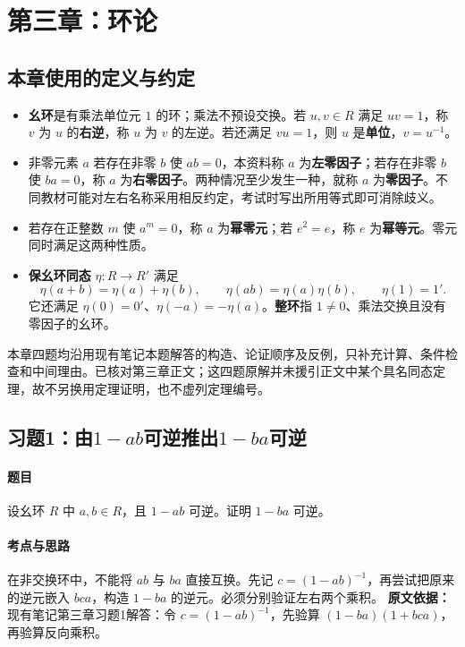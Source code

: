 \section{第三章：环论}

\subsection*{本章使用的定义与约定}
\begin{itemize}
  \item \textbf{幺环}是有乘法单位元 $1$ 的环；乘法不预设交换。若 $u,v\in R$ 满足 $uv=1$，称 $v$ 为 $u$ 的\textbf{右逆}，称 $u$ 为 $v$ 的左逆。若还满足 $vu=1$，则 $u$ 是\textbf{单位}，$v=u^{-1}$。
  \item 非零元素 $a$ 若存在非零 $b$ 使 $ab=0$，本资料称 $a$ 为\textbf{左零因子}；若存在非零 $b$ 使 $ba=0$，称 $a$ 为\textbf{右零因子}。两种情况至少发生一种，就称 $a$ 为\textbf{零因子}。不同教材可能对左右名称采用相反约定，考试时写出所用等式即可消除歧义。
  \item 若存在正整数 $m$ 使 $a^m=0$，称 $a$ 为\textbf{幂零元}；若 $e^2=e$，称 $e$ 为\textbf{幂等元}。零元同时满足这两种性质。
  \item \textbf{保幺环同态} $\eta:R\to R'$ 满足
  \[
  \eta(a+b)=\eta(a)+\eta(b),\qquad
  \eta(ab)=\eta(a)\eta(b),\qquad \eta(1)=1'.
  \]
  它还满足 $\eta(0)=0'$、$\eta(-a)=-\eta(a)$。\textbf{整环}指 $1\ne0$、乘法交换且没有零因子的幺环。
\end{itemize}
本章四题均沿用现有笔记本题解答的构造、论证顺序及反例，只补充计算、条件检查和中间理由。已核对第三章正文；这四题原解并未援引正文中某个具名同态定理，故不另换用定理证明，也不虚列定理编号。

\subsection{习题1：由\texorpdfstring{$1-ab$}{1-ab}可逆推出\texorpdfstring{$1-ba$}{1-ba}可逆}\label{exercise:3:1}
\paragraph{题目}
设幺环 $R$ 中 $a,b\in R$，且 $1-ab$ 可逆。证明 $1-ba$ 可逆。

\paragraph{考点与思路}
在非交换环中，不能将 $ab$ 与 $ba$ 直接互换。先记 $c=(1-ab)^{-1}$，再尝试把原来的逆元嵌入 $bca$，构造 $1-ba$ 的逆元。必须分别验证左右两个乘积。
\textbf{原文依据：}现有笔记第三章习题1解答：令 $c=(1-ab)^{-1}$，先验算 $(1-ba)(1+bca)$，再验算反向乘积。

